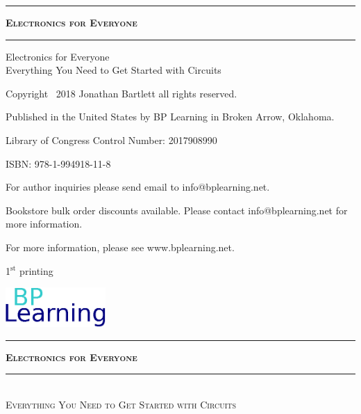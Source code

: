 \begin{titlepage}

\thispagestyle{empty}
\vspace*{\fill}
\begin{center}
\hrule
{\LARGE \textsc{\textbf{Electronics for Everyone}}}
\baselineskip
\hrule
\end{center}
\vspace*{\fill}

\clearpage %

\thispagestyle{empty}
\vspace*{\fill}

{\small
Electronics for Everyone \\
Everything You Need to Get Started with Circuits

Copyright \textcopyright\ 2018 Jonathan Bartlett all rights reserved.

Published in the United States by BP Learning in Broken Arrow, Oklahoma.


Library of Congress Control Number: 2017908990

ISBN: 978-1-994918-11-8

For author inquiries please send email to info@bplearning.net.  

Bookstore bulk order discounts available.  Please contact info@bplearning.net for more information.

For more information, please see www.bplearning.net.

1$^{\textrm{st}}$ printing
}
\baselineskip

\includegraphics[width=1.5in]{BPLearning.eps}


\vspace*{\fill}

\clearpage %

\thispagestyle{empty}
\vspace*{\fill}
\begin{center}
\hrule
{\LARGE \textsc{\textbf{Electronics for Everyone}}}
\baselineskip
\hrule
{}\baselineskip
{\Large \textsc{\\ Everything You Need to Get Started with Circuits
}}


\end{center}
\end{titlepage}

